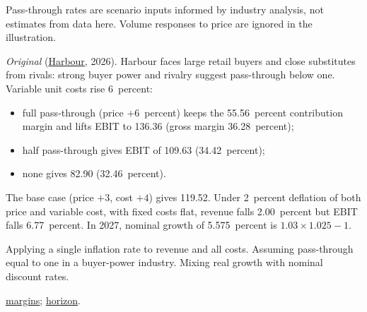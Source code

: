 \begin{qfmethod}
 Pass-through rates are scenario inputs informed by industry analysis, not estimates from data here. Volume responses to price are ignored in the illustration.

 \emph{Original} (\hyperref[ex:harbour-pro-forma-model]{Harbour}, 2026). Harbour faces large retail buyers and close substitutes from rivals: strong buyer power and rivalry suggest pass-through below one. Variable unit costs rise 6~percent:
\begin{itemize}
\item full pass-through (price $+6$~percent) keeps the 55.56~percent contribution margin and lifts EBIT to 136.36 (gross margin 36.28~percent);
\item half pass-through gives EBIT of 109.63 (34.42~percent);
\item none gives 82.90 (32.46~percent).
\end{itemize}
The base case (price $+3$, cost $+4$) gives 119.52. Under 2~percent deflation of both price and variable cost, with fixed costs flat, revenue falls 2.00~percent but EBIT falls 6.77~percent. In 2027, nominal growth of 5.575~percent is $1.03\times1.025-1$.

 Applying a single inflation rate to revenue and all costs. Assuming pass-through equal to one in a buyer-power industry. Mixing real growth with nominal discount rates.

 \hyperref[meth:income-statement-ratios]{margins}; \hyperref[meth:forecast-horizon-steady-state]{horizon}.

\end{qfmethod}

